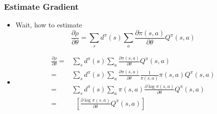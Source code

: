 \begin{frame}
  \frametitle{Estimate Gradient}
  \begin{itemize}
  \item Wait, how to estimate
    \begin{equation*}
      \frac{\partial \rho}{\partial \theta} = \sum_s d^\pi (s) \sum_a \frac{\partial \pi(s, a)}{\partial \theta} Q^\pi(s, a)
    \end{equation*}
  \item
    \begin{align*}
      \frac{\partial \rho}{\partial \theta}
      =& \sum_s d^\pi (s) \sum_a \frac{\partial \pi(s, a)}{\partial \theta} Q^\pi(s, a) \\
      =& \sum_s d^\pi (s) \sum_a \frac{\partial \pi(s, a)}{\partial \theta} \frac{1}{\pi(s, a)} \pi(s, a)  Q^\pi(s, a) \\
      =& \sum_s d^\pi (s) \sum_a \pi(s, a) \frac{\partial \log \pi(s, a)}{\partial \theta} Q^\pi(s, a) \\
      =& \mathop{\mathbb{E}_{\sim \pi}} \left[ \frac{\partial \log \pi(s, a)}{\partial \theta} Q^\pi(s, a) \right]
    \end{align*}
\end{itemize}
\end{frame}